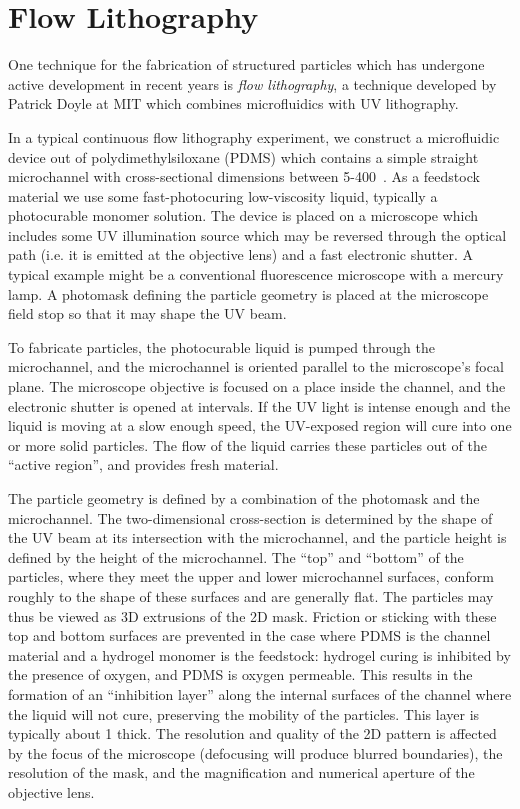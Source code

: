 \section{Flow Lithography}

One technique for the fabrication of structured particles which has undergone active development in recent years is 
\textit{flow lithography}, a technique developed by Patrick Doyle at MIT which combines microfluidics with 
UV lithography.

In a typical continuous flow lithography experiment, we construct a microfluidic device out of polydimethylsiloxane (PDMS)
which contains a simple straight microchannel with cross-sectional dimensions between 5-400~\microns. As a feedstock
material we use some fast-photocuring low-viscosity liquid, typically a photocurable monomer solution. The device is 
placed on a microscope which includes some UV illumination source which may be reversed through the optical path (i.e.
it is emitted at the objective lens) and a fast electronic shutter. A typical example might be a conventional 
fluorescence microscope with a mercury lamp.  A photomask defining the particle geometry is placed at the microscope
field stop so that it may shape the UV beam.

To fabricate particles, the photocurable liquid is pumped through the microchannel, and the microchannel is oriented
parallel to the microscope's focal plane. The microscope objective is focused on a place inside the channel, and the
electronic shutter is opened at intervals. If the UV light is intense enough and the liquid is moving at a slow enough speed,
the UV-exposed region will cure into one or more solid particles.  
The flow of the liquid carries these particles out of the ``active 
region'', and provides fresh material.

The particle geometry is defined by a combination of the photomask and the microchannel.  The two-dimensional cross-section
is determined by the shape of the UV beam at its intersection with the microchannel, and the particle height is defined by
the height of the microchannel. The ``top'' and ``bottom'' of the particles, where they meet the upper and lower
microchannel surfaces, conform roughly to the shape of these surfaces and are generally flat.
The particles may thus be viewed as 3D extrusions of the 2D mask.  Friction or sticking with these top and bottom
surfaces are prevented in the case where PDMS is the channel material and a hydrogel monomer is the feedstock: hydrogel
curing is inhibited by the presence of oxygen, and PDMS is oxygen permeable. This results in the formation of an 
``inhibition layer'' along the internal surfaces of the channel where the liquid will not cure, preserving the mobility 
of the particles. This layer is typically about 1 \microns thick.
The resolution and quality of the 2D pattern 
is affected by the focus of the microscope (defocusing will produce blurred boundaries), the resolution of the mask,
and the magnification and numerical aperture of the objective lens.  

